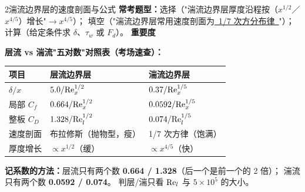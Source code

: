 \begin{kaodian}{2}{湍流边界层的速度剖面与公式}
\textbf{常考题型：}选择（"湍流边界层厚度沿程按（$x^{ 1/2}$／$x^{4/5}$）增长"$\to x^{4/5}$）；
填空（"湍流边界层常用速度剖面为\underline{\ 1/7 次方分布律\ }"）；
计算（给定条件求 $\delta$、$\tau_w$ 或 $F_d$）。
\textbf{重要度 }\quad{}\quad{}

\begin{banfa}
\textbf{层流 vs 湍流"五对数"对照表（考场速查）：}
\begin{center}
\begin{tabularx}{\textwidth}{@{}lXX@{}}
\toprule
项目 & 层流边界层 & 湍流边界层 \\
\midrule
$\delta/x$ & $5.0/\mathrm{Re}_x^{1/2}$ & $0.37/\mathrm{Re}_x^{1/5}$ \\
局部 $C_f$ & $0.664/\mathrm{Re}_x^{1/2}$ & $0.0592/\mathrm{Re}_x^{1/5}$ \\
整板 $C_D$ & $1.328/\mathrm{Re}_l^{1/2}$ & $0.074/\mathrm{Re}_l^{1/5}$ \\
速度剖面 & 布拉修斯（抛物型，瘦） & 1/7 次方律（饱满） \\
厚度增长 & $\propto x^{1/2}$（缓） & $\propto x^{4/5}$（快） \\
\bottomrule
\end{tabularx}
\end{center}
\textbf{记系数的方法：}层流只有两个数 \textbf{0.664 / 1.328}（后一个是前一个的 2 倍）；
湍流只有两个数 \textbf{0.0592 / 0.074}。
判层/湍只看 $\mathrm{Re}_l$ 与 $5\times10^5$ 的大小。
\end{banfa}
\end{kaodian}

